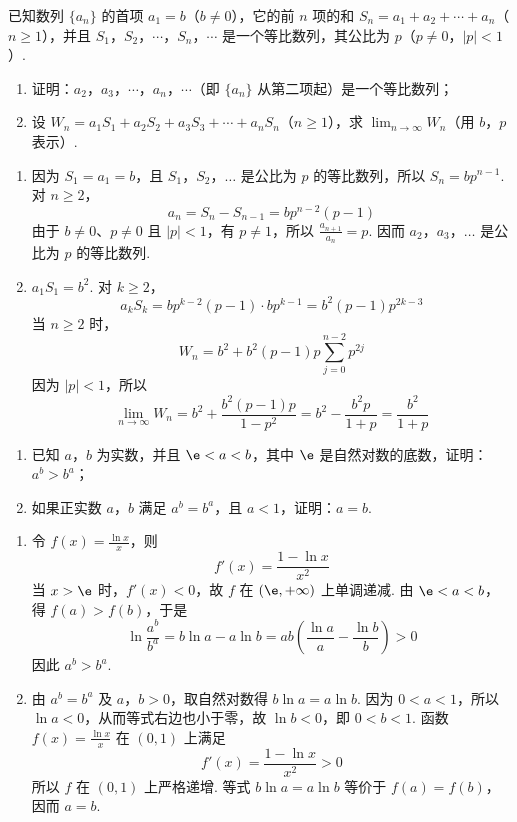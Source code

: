 \begin{problem}
已知数列 \(\{a_{n}\}\) 的首项 \(a_{1} = b\)（\(b \neq 0\)），它的前 \(n\) 项的和 \(S_{n} = a_{1} + a_{2} + \cdots + a_{n}\)（\(n \geqslant 1\)），并且 \(S_{1}\)，\(S_{2}\)，\(\cdots\)，\(S_{n}\)，\(\cdots\) 是一个等比数列，其公比为 \(p\)（\(p \neq 0\)，\(|p| < 1\)）.

\begin{enumerate}
\item 证明：\(a_{2}\)，\(a_{3}\)，\(\cdots\)，\(a_{n}\)，\(\cdots\)（即 \(\{a_{n}\}\) 从第二项起）是一个等比数列；
\item 设 \(W_{n}=a_{1}S_{1}+a_{2}S_{2}+a_{3}S_{3}+\cdots+a_{n}S_{n}\)（\(n\geqslant1\)），求 \(\displaystyle\lim_{n\to\infty}W_{n}\)（用 \(b\)，\(p\) 表示）.
\end{enumerate}

\begin{solution}
\begin{enumerate}
\item 因为 \(S_{1}=a_{1}=b\)，且 \(S_{1}\)，\(S_{2}\)，\(\ldots\) 是公比为 \(p\) 的等比数列，所以 \(S_{n}=bp^{n-1}\). 对 \(n\geqslant2\)，
\[
a_{n}=S_{n}-S_{n-1}=bp^{n-2}(p-1)
\]
由于 \(b\neq0\)、\(p\neq0\) 且 \(|p|<1\)，有 \(p\neq1\)，所以 \(\frac{a_{n+1}}{a_{n}}=p\). 因而 \(a_{2}\)，\(a_{3}\)，\(\ldots\) 是公比为 \(p\) 的等比数列.
\item \(a_{1}S_{1}=b^{2}\). 对 \(k\geqslant2\)，
\[
a_{k}S_{k}=bp^{k-2}(p-1)\cdot bp^{k-1}=b^{2}(p-1)p^{2k-3}
\]
当 \(n\geqslant2\) 时，
\[
W_{n}=b^{2}+b^{2}(p-1)p\sum_{j=0}^{n-2}p^{2j}
\]
因为 \(|p|<1\)，所以
\[
\lim_{n\to\infty}W_{n}=b^{2}+\frac{b^{2}(p-1)p}{1-p^{2}}=b^{2}-\frac{b^{2}p}{1+p}=\frac{b^{2}}{1+p}
\]
\end{enumerate}
\end{solution}
\end{problem}

\begin{problem}
\begin{enumerate}
\item 已知 \(a\)，\(b\) 为实数，并且 \(\e < a < b\)，其中 \(\e\) 是自然对数的底数，证明：\(a^b > b^a\)；
\item 如果正实数 \(a\)，\(b\) 满足 \(a^b = b^a\)，且 \(a < 1\)，证明：\(a = b\).
\end{enumerate}

\begin{solution}
\begin{enumerate}
\item 令 \(f(x)=\frac{\ln x}{x}\)，则
\[
f'(x)=\frac{1-\ln x}{x^{2}}
\]
当 \(x>\e\) 时，\(f'(x)<0\)，故 \(f\) 在 \((\e,+\infty)\) 上单调递减. 由 \(\e<a<b\)，得 \(f(a)>f(b)\)，于是
\[
\ln\frac{a^{b}}{b^{a}}=b\ln a-a\ln b=ab\left(\frac{\ln a}{a}-\frac{\ln b}{b}\right)>0
\]
因此 \(a^{b}>b^{a}\).
\item 由 \(a^{b}=b^{a}\) 及 \(a\)，\(b>0\)，取自然对数得 \(b\ln a=a\ln b\). 因为 \(0<a<1\)，所以 \(\ln a<0\)，从而等式右边也小于零，故 \(\ln b<0\)，即 \(0<b<1\). 函数 \(f(x)=\frac{\ln x}{x}\) 在 \((0,1)\) 上满足
\[
f'(x)=\frac{1-\ln x}{x^{2}}>0
\]
所以 \(f\) 在 \((0,1)\) 上严格递增. 等式 \(b\ln a=a\ln b\) 等价于 \(f(a)=f(b)\)，因而 \(a=b\).
\end{enumerate}
\end{solution}
\end{problem}
